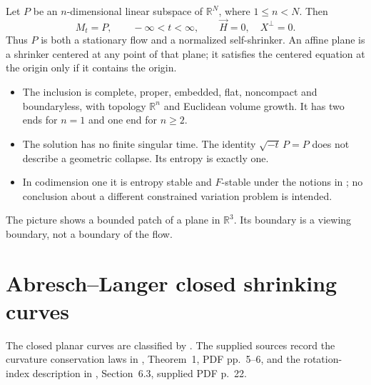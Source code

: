 \begin{example}\label{ex:catalogue-plane-shrinker}
Let $P$ be an $n$-dimensional linear subspace of $\mathbb R^N$, where
$1\leq n<N$. Then
\[
 M_t=P,\qquad -\infty<t<\infty,
 \qquad \vec H=0,\quad X^\perp=0.
\]
Thus $P$ is both a stationary flow and a normalized self-shrinker.
An affine plane is a shrinker centered at any point of that plane; it
satisfies the centered equation at the origin only if it contains the origin.
\begin{itemize}
\item The inclusion is complete, proper, embedded, flat, noncompact and
boundaryless, with topology $\mathbb R^n$ and Euclidean volume growth.
It has two ends for $n=1$ and one end for $n\geq2$.
\item The solution has no finite singular time. The identity
$\sqrt{-t}\,P=P$ does not describe a geometric collapse.
Its entropy is exactly one.
\item In codimension one it is entropy stable and $F$-stable under the
notions in \cite{CM12}; no conclusion about a different constrained
variation problem is intended.
\end{itemize}
The picture shows a bounded patch of a plane in $\mathbb R^3$. Its boundary
is a viewing boundary, not a boundary of the flow.
\end{example}

\chapter{Abresch--Langer closed shrinking curves}\label{sec:catalogue-abresch-langer}
The closed planar curves are classified by \cite{CatAL1986}.
The supplied sources record the curvature conservation laws in
\cite{CatDLN2018}, Theorem~1, PDF pp.~5--6, and the rotation-index
description in \cite{CatCMComplexity2020}, Section~6.3, supplied PDF p.~22.


